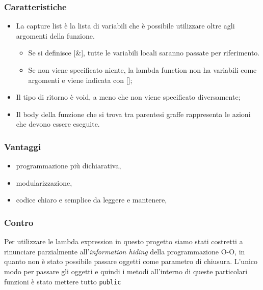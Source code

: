 \subsubsection{Caratteristiche}
\begin{itemize}
	\item La capture list è la lista di variabili che è possibile utilizzare oltre agli argomenti della funzione.
	\begin{itemize}
		\item Se si definisce [\&], tutte le variabili locali saranno passate per riferimento.
		\item Se non viene specificato niente, la lambda function non ha variabili come argomenti e viene indicata con [];
	\end{itemize}
	\item Il tipo di ritorno è void, a meno che non viene specificato diversamente;
	\item Il body della funzione che si trova tra parentesi graffe rappresenta le azioni che devono essere eseguite.
\end{itemize}

\subsubsection{Vantaggi}
\begin{itemize}
	\item programmazione più dichiarativa,
	\item modularizzazione,
	\item codice chiaro e semplice da leggere e mantenere,
\end{itemize}

\subsubsection{Contro}
Per utilizzare le lambda expression in questo progetto siamo stati costretti a rinunciare parzialmente all'\textit{information hiding} della programmazione O-O, in quanto non è stato possibile passare oggetti come parametro di chiusura. L'unico modo per passare gli oggetti e quindi i metodi all'interno di queste particolari funzioni è stato mettere tutto \texttt{public}

